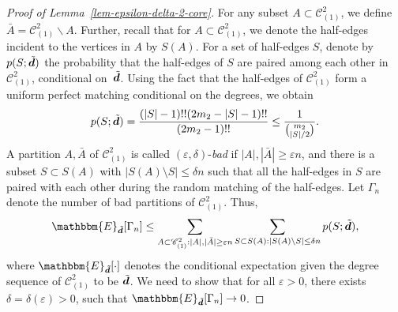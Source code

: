 \documentclass[11pt,a4paper, reqno]{article}
\numberwithin{equation}{section}
\numberwithin{equation}{section}
\def\sss{\scriptscriptstyle}
\newcommand*{\Mtilde}[1]{\skew{5}{\tilde}{#1}}
\newcommand{\E}{\ensuremath{\mathbbm{E}}}
\newcommand{\1}{\ensuremath{\mathbbm{1}}}
\newcommand{\bld}[1]{\boldsymbol{#1}}
\numberwithin{equation}{section}
\numberwithin{theorem}{section}
\begin{document}
\begin{proof}[Proof of Lemma~\ref{lem-epsilon-delta-2-core}]
For any subset $A \subset \mathscr{C}_{\sss (1)}^2$, we define $\bar{A} = \mathscr{C}_{\sss (1)}^2 \backslash A$. 
Further, recall that for $A \subset \mathscr{C}_{\sss (1)}^2$, we denote the half-edges incident to the vertices in $A$ by $S(A)$. 
For a set of half-edges $S$, denote by $p(S;\Mtilde{\bld{d}})$ the probability that the half-edges of $S$ are paired among each other in $\mathscr{C}_{\sss (1)}^2$, conditional on~$\Mtilde{\bld{d}}$. Using the fact that the half-edges of $\mathscr{C}_{\sss (1)}^2$ form a uniform perfect matching conditional on the degrees,  we obtain
\begin{equation}\label{expr-p-S}
p(S;\Mtilde{\bld{d}}) = \frac{(|S| -1) !! (2m_2 - |S| - 1) !!}{(2m_2-1)!!} \leq \frac{1}{ \binom{m_2}{|S|/2 }}.
\end{equation}
A partition $A, \bar{A}$ of $\mathscr{C}_{\sss (1)}^2$ is called $(\varepsilon,\delta)$-\emph{bad} if $|A|, | \bar{A}| \geq \varepsilon n$, and  there is a subset $S\subset S(A)$ with $|S(A) \setminus S| \leq \delta n$ such that all the half-edges in $S$ are paired with each other during the random matching of the half-edges. 
Let $\Gamma_n$ denote the number of bad partitions of $\mathscr{C}_{\sss (1)}^2$.
 Thus, 
\begin{align}
\E_{\Mtilde{\bld{d}}}[\Gamma_n] \leq \sum_{ A \subset \mathscr{C}_{\sss (1)}^2 : |A|, |\bar{A}| \geq \varepsilon n } \sum_{S \subset S(A): |S(A)\backslash S| \leq \delta n} p(S;\Mtilde{\bld{d}}), \label{eq:firstmoment} 
\end{align}
where $\E_{\bld{\tilde{d}}}[\cdot]$ denotes the conditional expectation given the degree sequence of $\mathscr{C}_{\sss (1)}^2$ to be $\Mtilde{\bld{d}}$.
We need to show that for all $\varepsilon>0$, there exists $\delta = \delta(\varepsilon)>0$, such that  $\E_{\Mtilde{\bld{d}}}[\Gamma_n]\to 0$.


\end{proof}
\end{document}
